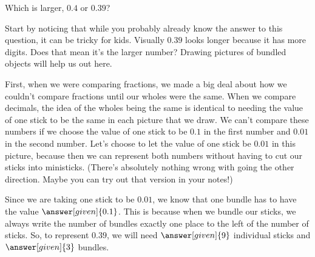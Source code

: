 \documentclass{ximera}
\begin{document}
\begin{question}
Which is larger, $0.4$ or $0.39$?

\begin{explanation}
Start by noticing that while you probably already know the answer to this question, it can be tricky for kids. Visually $0.39$ looks longer because it has more digits. Does that mean it's the larger number? Drawing pictures of bundled objects will help us out here.

First, when we were comparing fractions, we made a big deal about how we couldn't compare fractions until our wholes were the same. When we compare decimals, the idea of the wholes being the same is identical to needing the value of one stick to be the same in each picture that we draw. We can't compare these numbers if we choose the value of one stick to be $0.1$ in the first number and $0.01$ in the second number. Let's choose to let the value of one stick be $0.01$ in this picture, because then we can represent both numbers without having to cut our sticks into ministicks. (There's absolutely nothing wrong with going the other direction. Maybe you can try out that version in your notes!)

Since we are taking one stick to be $0.01$, we know that one bundle has to have the value $\answer[given]{0.1}$. This is because when we bundle our sticks, we always write the number of bundles exactly one place to the left of the number of sticks. So, to represent $0.39$, we will need $\answer[given]{9}$ individual sticks and $\answer[given]{3}$ bundles. 

\begin{image}
\end{image}
\end{explanation}
\end{question}
\end{document}
